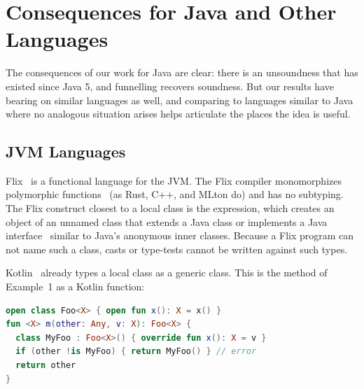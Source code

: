 \section{Consequences for Java and Other Languages}
\label{sec:impact}
The consequences of our work for Java are clear: there is an unsoundness that has existed since Java 5, and funnelling recovers soundness. But our results have bearing on similar languages as well, and comparing to languages similar to Java where no analogous situation arises helps articulate the places the idea is useful.

\subsection{JVM Languages}


Flix~\cite{madsen2016from} is a functional language for the JVM.
The Flix compiler monomorphizes polymorphic functions~\cite{madsen2023programming} (as Rust, C++, and MLton do) and has no subtyping.
The Flix construct closest to a local class is the \Q@new@ expression, which creates an object of an unnamed class that extends a Java class or implements a Java interface~\cite[\S14.4]{flix_book}
similar to Java's anonymous inner classes. Because a Flix program can not name such a class, casts or type-tests cannot be written against such types.

Kotlin~\cite{kotlin_spec} already types a local class as a generic class.
This is the method \Q@m@ of Example~1 as a Kotlin function:

\begin{lstlisting}[language=Kotlin]
open class Foo<X> { open fun x(): X = x() }
fun <X> m(other: Any, v: X): Foo<X> {
  class MyFoo : Foo<X>() { override fun x(): X = v }
  if (other !is MyFoo) { return MyFoo() } // error
  return other
}
\end{lstlisting}

